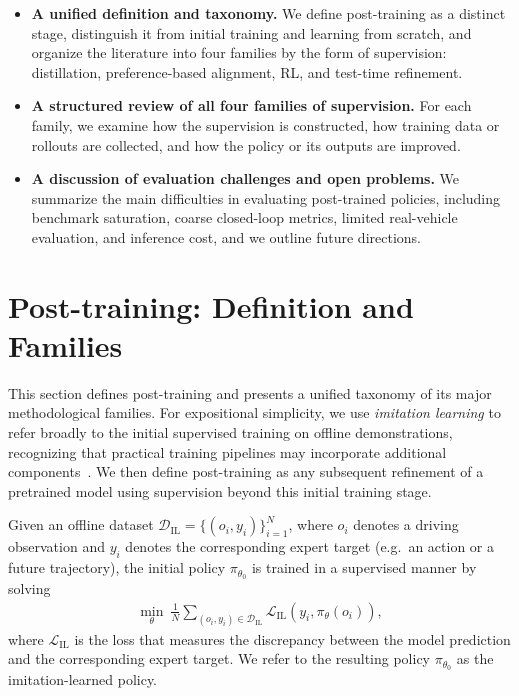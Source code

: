 \documentclass[runningheads]{llncs}
\begin{document}
\begin{itemize}
\item \textbf{A unified definition and taxonomy.} We define post-training as a distinct stage, distinguish it from initial training and learning from scratch, and organize the literature into four families by the form of supervision: distillation, preference-based alignment, RL, and test-time refinement.
\item \textbf{A structured review of all four families of supervision.} For each family, we examine how the supervision is constructed, how training data or rollouts are collected, and how the policy or its outputs are improved.
\item \textbf{A discussion of evaluation challenges and open problems.} We summarize the main difficulties in evaluating post-trained policies, including benchmark saturation, coarse closed-loop metrics, limited real-vehicle evaluation, and inference cost, and we outline future directions.
\end{itemize}





\section{Post-training: Definition and Families}
\label{sec:pipeline}
This section defines post-training and presents a unified taxonomy of its major methodological families. For expositional simplicity, we use {\em imitation learning} to refer broadly to the initial supervised training  on offline demonstrations, recognizing that practical training pipelines may incorporate additional components~\cite{chitta2022transfuser,hu2023planning,jiang2023vad}. We then define post-training as any subsequent refinement of a pretrained model using supervision beyond this initial training stage. 

\vspace{0.5em}
Given an offline dataset \(\mathcal{D}_{\text{IL}}=\{(o_i,y_i)\}_{i=1}^{N}\), where \(o_i\) denotes a driving observation and \(y_i\) denotes the corresponding expert target (e.g.~an action or a future trajectory), the initial policy \(\pi_{\theta_0}\) is trained in a supervised manner by solving 
\vspace{-0.3em}
\begin{align}
\label{eq: imitation learning}    
\min_{\theta}~ \frac{1}{N} \sum_{(o_i, y_i)\in \mathcal{D}_{\text{IL}}} \mathcal{L}_{\mathrm{IL}}(y_i,\pi_\theta(o_i)),
\end{align} 
\baselineskip 
\noindent 
where $\mathcal{L}_{\mathrm{IL}}$ is the loss that measures the discrepancy between the model prediction and the corresponding expert target. We refer to the resulting policy \(\pi_{\theta_0}\) as the imitation-learned policy. 
\end{document}
